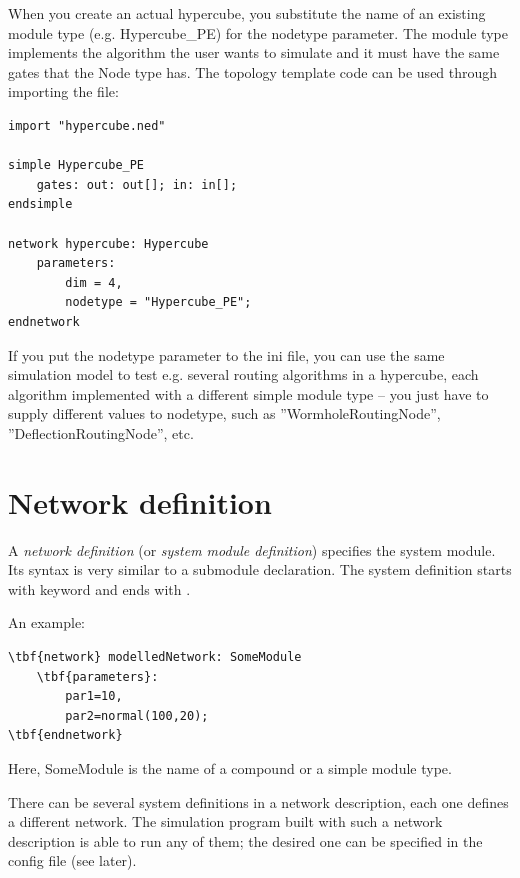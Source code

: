 When you create an actual hypercube, you substitute the name
of an existing module type (e.g. Hypercube\_PE) for the nodetype
parameter. The module type implements the algorithm the user
wants to simulate and it must have the same gates that the Node
type has. The topology template code can be used through importing
the file:


\begin{Verbatim}[commandchars=\\\{\}]
import "hypercube.ned"

simple Hypercube_PE
    gates: out: out[]; in: in[];
endsimple

network hypercube: Hypercube
    parameters:
        dim = 4,
        nodetype = "Hypercube_PE";
endnetwork
\end{Verbatim}



If you put the nodetype parameter to the ini file, you can use the
same simulation model to test e.g. several routing algorithms in a
hypercube, each algorithm implemented with a different
simple module type -- you just have to supply
different values to nodetype, such as ''WormholeRoutingNode'',
''DeflectionRoutingNode'', etc.





\section{Network definition}


A \textit{network definition} (or \textit{system module
  definition}) specifies the system module. Its syntax is very
similar to a submodule declaration. The system definition starts with
keyword  and ends with
.


An example:


\begin{Verbatim}[commandchars=\\\{\}]
\tbf{network} modelledNetwork: SomeModule
    \tbf{parameters}:
        par1=10,
        par2=normal(100,20);
\tbf{endnetwork}
\end{Verbatim}


Here, SomeModule is the name of a compound or a simple module type.


There can be several system definitions in a network description,
each one defines a different network. The simulation program
built with such a network description is able to run any of them;
the desired one can be specified in the config file (see later).





